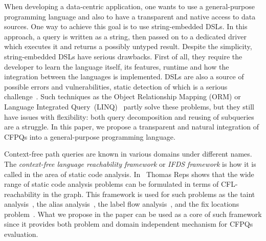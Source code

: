 When developing a data-centric application, one wants to use a general-purpose programming language and also to have a transparent and native access to data sources. 
One way to achieve this goal is to use string-embedded DSLs. 
In this approach, a query is written as a string, then passed on to a dedicated driver which executes it and returns a possibly untyped result.
Despite the simplicity, string-embedded DSLs have serious drawbacks. 
First of all, they require the developer to learn the language itself, its features, runtime and how the integration between the languages is implemented. 
DSLs are also a source of possible errors and vulnerabilities, static detection of which is a serious challenge~\cite{stringEmbeddedLanguagesProblem}. 
Such techniques as the Object Relationship Mapping (ORM) or Language Integrated Query~(LINQ)~\cite{LINQ1, LINQ2, LinqRDF} partly solve these problems, but they still have issues with flexibility: both query decomposition and  reusing of subqueries are a struggle. 
In this paper, we propose a transparent and natural integration of CFPQs into a general-purpose programming language.




Context-free path queries are known in various domains under different names. The \emph{context-free language reachability framework} or  \emph{IFDS framework} is how it is called in the area of static code analysis. 
In~\cite{Reps:1995, Reps} Thomas Reps shows that the wide range of static code analysis problems can be formulated in terms of CFL-reachability in the graph. 
This framework is used for such problems as the taint analysis~\cite{CFLTaint}, the alias analysis~\cite{JavaCFL, Zheng, CFLGraspan}, the label flow analysis~\cite{LabelFlowCFLReachability}, and the fix locations problem~\cite{CFLfinding}.
What we propose in the paper can be used as a core of such framework since it provides both problem and domain independent mechanism for CFPQs evaluation. 

